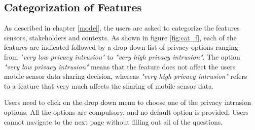 \subsection{Categorization of Features} \label{cat_feature}

As described in chapter \ref{model}, the users are asked to categorize the features sensors, stakeholders and contexts. As shown in figure 
\ref{fig:cat_f}, each of the features are indicated followed by a drop down list of privacy options ranging from \textit{"very low privacy intrusion"} to \textit{"very high privacy intrusion"}. The option \textit{"very low privacy intrusion"} means that the feature does not affect the users mobile sensor data sharing decision, whereas 
\textit{"very high privacy intrusion"} refers to a feature that very much affects the sharing of mobile sensor data. 

Users need to click on the
drop down menu to choose one of the privacy intrusion options. All the options are compulsory, and no default option is provided. Users cannot navigate to the next page without filling out all of the questions.

